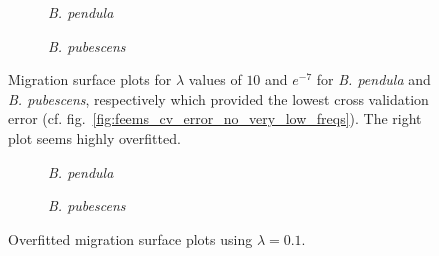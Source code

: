 \documentclass[hidelinks,11pt]{article}
\newcommand{\pendula}{\textit{B. pendula}}
\newcommand{\pubescens}{\textit{B. pubescens}}
\begin{document}
    \begin{figure}[H]
        \centering
        \begin{subfigure}[b]{0.47\textwidth}
            \centering
            \caption{\pendula{}}
        \end{subfigure}
        \hfill
        \begin{subfigure}[b]{0.47\textwidth}
            \centering
            \caption{\pubescens{}}
        \end{subfigure}
        \caption{Migration surface plots for $\lambda$ values of $10$ and $e^{-7}$ for \pendula{} and \pubescens{}, respectively which provided the lowest cross validation error (cf. fig.~\ref{fig:feems_cv_error_no_very_low_freqs}). The right plot seems highly overfitted.}
        \label{fig:feems_no_very_low_freqs_lambda_cv}
    \end{figure}

    \begin{figure}[H]
        \centering
        \begin{subfigure}[b]{0.47\textwidth}
            \centering
            \caption{\pendula{}}
            \label{fig:feems_no_very_low_freqs_pendula_lambda_0.1}
        \end{subfigure}
        \hfill
        \begin{subfigure}[b]{0.47\textwidth}
            \centering
            \caption{\pubescens{}}
            \label{fig:feems_no_very_low_freqs_pubescens_lambda_0.1}
        \end{subfigure}
        \caption{Overfitted migration surface plots using $\lambda = 0.1$.}
        \label{fig:feems_no_very_low_freqs_lambda_0.1}
    \end{figure}
\end{document}

